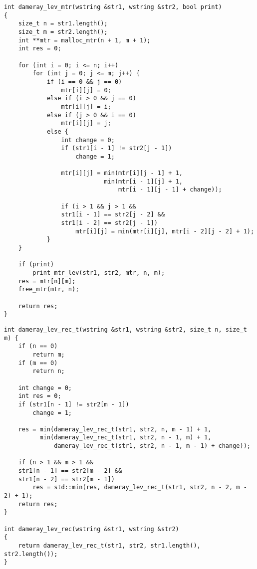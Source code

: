 \begin{lstlisting}[label=lst:dameray_lev_rec,caption=Функция нахождения расстояния Дамерау-Левенштейна с использованием матрицы]
int dameray_lev_mtr(wstring &str1, wstring &str2, bool print)
{
	size_t n = str1.length();
	size_t m = str2.length();
	int **mtr = malloc_mtr(n + 1, m + 1);
	int res = 0;
	
	for (int i = 0; i <= n; i++)
		for (int j = 0; j <= m; j++) {
			if (i == 0 && j == 0)
				mtr[i][j] = 0;
			else if (i > 0 && j == 0)
				mtr[i][j] = i;
			else if (j > 0 && i == 0)
				mtr[i][j] = j;
			else {
				int change = 0;
				if (str1[i - 1] != str2[j - 1])
					change = 1;
				
				mtr[i][j] = min(mtr[i][j - 1] + 1,
							min(mtr[i - 1][j] + 1,
								mtr[i - 1][j - 1] + change));
				
				if (i > 1 && j > 1 &&
				str1[i - 1] == str2[j - 2] &&
				str1[i - 2] == str2[j - 1])
					mtr[i][j] = min(mtr[i][j], mtr[i - 2][j - 2] + 1);
			}
	}
	
	if (print)
		print_mtr_lev(str1, str2, mtr, n, m);
	res = mtr[n][m];
	free_mtr(mtr, n);
	
	return res;
}
\end{lstlisting}

\clearpage

\begin{lstlisting}[label=lst:dameray_lev_mtr,caption=Функция нахождения расстояния Дамерау-Левенштейна рекурсивно]
int dameray_lev_rec_t(wstring &str1, wstring &str2, size_t n, size_t m) {
	if (n == 0)
		return m;
	if (m == 0)
		return n;
	
	int change = 0;
	int res = 0;
	if (str1[n - 1] != str2[m - 1])
		change = 1;
	
	res = min(dameray_lev_rec_t(str1, str2, n, m - 1) + 1,
		  min(dameray_lev_rec_t(str1, str2, n - 1, m) + 1,
		      dameray_lev_rec_t(str1, str2, n - 1, m - 1) + change));
	
	if (n > 1 && m > 1 &&
	str1[n - 1] == str2[m - 2] &&
	str1[n - 2] == str2[m - 1])
		res = std::min(res, dameray_lev_rec_t(str1, str2, n - 2, m - 2) + 1);
	return res;
}

int dameray_lev_rec(wstring &str1, wstring &str2)
{
	return dameray_lev_rec_t(str1, str2, str1.length(), str2.length());
}
\end{lstlisting}

\clearpage

